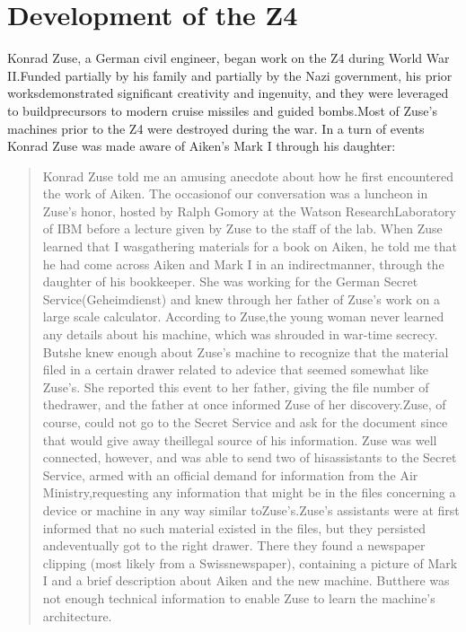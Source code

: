 \section{Development of the Z4}
Konrad Zuse, a German civil engineer, began work on the Z4 during World War
II.Funded partially by his family and partially by the Nazi government, his
prior worksdemonstrated significant creativity and ingenuity, and they were
leveraged to buildprecursors to modern cruise missiles and guided bombs.Most of
Zuse's machines prior to the Z4 were destroyed during the war.  In a turn of events Konrad Zuse was made
aware of Aiken's Mark I through his daughter:
\begin{quotation}
    Konrad Zuse told me an amusing anecdote about how he first encountered the work of Aiken. The occasionof our conversation was a luncheon in Zuse's honor, hosted by Ralph Gomory at the Watson ResearchLaboratory of IBM before a lecture given by Zuse to the staff of the lab. When Zuse learned that I wasgathering materials for a book on Aiken, he told me that he had come across Aiken and Mark I in an indirectmanner, through the daughter of his bookkeeper. She was working for the German Secret Service(Geheimdienst) and knew through her father of Zuse's work on a large scale calculator. According to Zuse,the young woman never learned any details about his machine, which was shrouded in war-time secrecy. Butshe knew enough about Zuse's machine to recognize that the material filed in a certain drawer related to adevice that seemed somewhat like Zuse's. She reported this event to her father, giving the file number of thedrawer, and the father at once informed Zuse of her discovery.Zuse, of course, could not go to the Secret Service and ask for the document since that would give away theillegal source of his information. Zuse was well connected, however, and was able to send two of hisassistants to the Secret Service, armed with an official demand for information from the Air Ministry,requesting any information that might be in the files concerning a device or machine in any way similar toZuse's.Zuse's assistants were at first informed that no such material existed in the files, but they persisted andeventually got to the right drawer. There they found a newspaper clipping (most likely from a Swissnewspaper), containing a picture of Mark I and a brief description about Aiken and the new machine. Butthere was not enough technical information to enable Zuse to learn the machine's architecture.
    \cite{howard_aiken_and_the_dawn_of_the_computer_age_2000}
\end{quotation}
